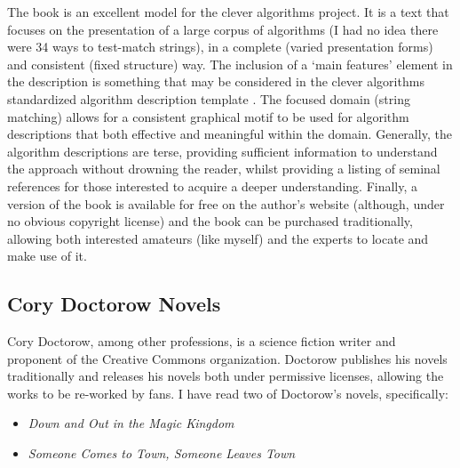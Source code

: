 \documentclass[a4paper, 11pt]{article}
\begin{document}
The book is an excellent model for the clever algorithms project. It is a text that focuses on the presentation of a large corpus of algorithms (I had no idea there were 34 ways to test-match strings), in a complete (varied presentation forms) and consistent (fixed structure) way. The inclusion of a `main features' element in the description is something that may be considered in the clever algorithms standardized algorithm description template \cite{Brownlee2010a}. The focused domain (string matching) allows for a consistent graphical motif to be used for algorithm descriptions that both effective and meaningful within the domain. Generally, the algorithm descriptions are terse, providing sufficient information to understand the approach without drowning the reader, whilst providing a listing of seminal references for those interested to acquire a deeper understanding. Finally, a version of the book is available for free on the author's website (although, under no obvious copyright license) and the book can be purchased traditionally, allowing both interested amateurs (like myself) and the experts to locate and make use of it.

% 
% 
\subsection{Cory Doctorow Novels}
\label{subsec:doctorow}
Cory Doctorow, among other professions, is a science fiction writer and proponent of the Creative Commons organization. Doctorow publishes his novels traditionally and releases his novels both under permissive licenses, allowing the works to be re-worked by fans. I have read two of Doctorow's novels, specifically: 

\begin{itemize}
	\item \emph{Down and Out in the Magic Kingdom} \cite{Doctorow2003}
	\item \emph{Someone Comes to Town, Someone Leaves Town} \cite{Doctorow2006}
\end{itemize}
\end{document}
